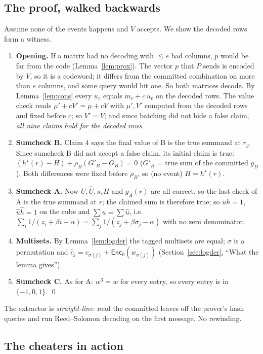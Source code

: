 \documentclass[11pt,a4paper]{article}
\newcommand{\EncZ}{\mathsf{Enc}_0}
\newcommand{\msk}[1]{#1^{\star}}
\newcommand{\uh}{\hat{u}}
\newcommand{\hh}{\hat{h}}
\newcommand{\zh}{\hat{z}}
\newcommand{\ch}{\hat{c}}
\theoremstyle{definition}
\theoremstyle{plain}
\begin{document}
\subsection{The proof, walked backwards}

Assume none of the events happens and $V$ accepts. We show the decoded rows form a witness.
\begin{enumerate}[leftmargin=1.5em]
\item \textbf{Opening.} If a matrix had no decoding with $\le e$ bad columns, $p$ would be far from the code
  (Lemma~\ref{lem:prox}). The vector $p$ that $P$ sends is encoded by $V$, so it is a codeword; it differs
  from the committed combination on more than $e$ columns, and some query would hit one. So both matrices
  decode. By Lemma~\ref{lem:cons} every $\bar u_v$ equals $m_v+c\,u_v$ on the decoded rows. The value check
  reads $\mu'+cV'=\mu+cV$ with $\mu',V'$ computed from the decoded rows and fixed before $c$; so $V'=V$;
  and since batching did not hide a false claim, \emph{all nine claims hold for the decoded rows}.
\item \textbf{Sumcheck B.} Claim 4 says the final value of B is the true summand at $r_y$. Since sumcheck B
  did not accept a false claim, its initial claim is true:
  $(\msk h(r)-H)+\rho_B(G'_B-G_B)=0$ ($G'_B$ = true sum of the committed $g_B$). Both differences were fixed
  before $\rho_B$, so (no event) $H=\msk h(r)$.
\item \textbf{Sumcheck A.} Now $U,\hat U,s,H$ and $g_A(r)$ are all correct, so the last check of A is the true
  summand at $r$; the claimed sum is therefore true; so $uh=1$, $\uh\hh=1$ on the cube and $\sum u=\sum\uh$,
  i.e.\ $\sum_i1/(z_i+\beta i-\alpha)=\sum_j1/(\zh_j+\beta\sigma_j-\alpha)$ with no zero denominator.
\item \textbf{Multisets.} By Lemma~\ref{lem:logder} the tagged multisets are equal; $\sigma$ is a permutation and
  $\ch_j=c_{\sigma(j)}+\EncZ(w_{\sigma(j)})$ (Section~\ref{sec:logder}, ``What the lemma gives'').
\item \textbf{Sumcheck C.} As for A: $w^3=w$ for every entry, so every entry is in $\{-1,0,1\}$. \qed
\end{enumerate}
The extractor is \emph{straight-line}: read the committed leaves off the prover's hash queries and run
Reed--Solomon decoding on the first message. No rewinding.

\subsection{The cheaters in action}
\label{sec:cheat}\label{sec:toy-cheat}
\end{document}
